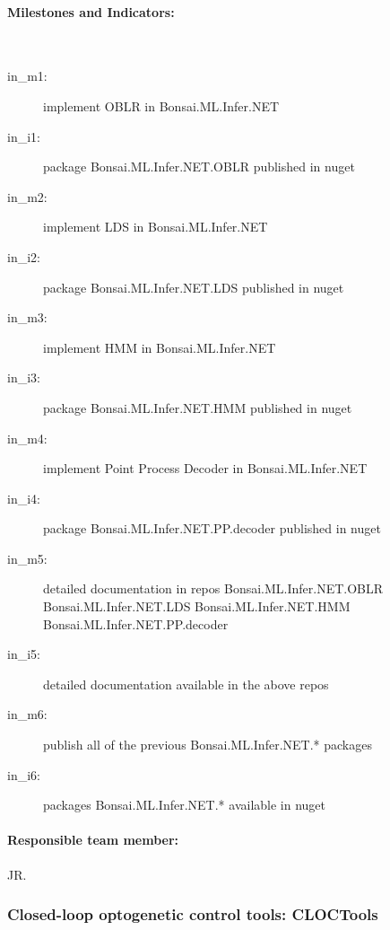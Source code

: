 \paragraph{Milestones and Indicators:}\mbox{}\\

\begin{description}

    \item[in\_m1:]  implement OBLR in Bonsai.ML.Infer.NET

    \item[in\_i1:] package Bonsai.ML.Infer.NET.OBLR published in nuget

    \item[in\_m2:] implement LDS in Bonsai.ML.Infer.NET

    \item[in\_i2:] package Bonsai.ML.Infer.NET.LDS published in nuget

    \item[in\_m3:] implement HMM in Bonsai.ML.Infer.NET

    \item[in\_i3:] package Bonsai.ML.Infer.NET.HMM published in nuget

    \item[in\_m4:] implement Point Process Decoder in Bonsai.ML.Infer.NET

    \item[in\_i4:] package Bonsai.ML.Infer.NET.PP.decoder published in nuget

    \item[in\_m5:] detailed documentation in repos Bonsai.ML.Infer.NET.OBLR
        Bonsai.ML.Infer.NET.LDS Bonsai.ML.Infer.NET.HMM
        Bonsai.ML.Infer.NET.PP.decoder

    \item[in\_i5:] detailed documentation available in the above repos

    \item[in\_m6:] publish all of the previous Bonsai.ML.Infer.NET.* packages
    \item[in\_i6:] packages Bonsai.ML.Infer.NET.* available in nuget

\end{description}

\paragraph{Responsible team member:} JR.

\subsubsection*{Closed-loop optogenetic control tools: CLOCTools}

